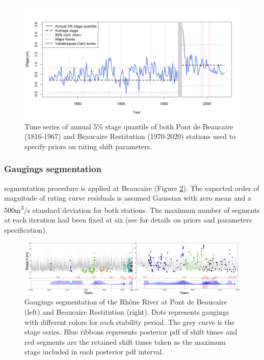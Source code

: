 \documentclass[11pt]{article}
\begin{document}
    \begin{figure}[h]
        \centering
        \includegraphics[width = 12cm]{Figs/5-Quant5perc_both.png}
        \caption{Time series of annual 5\% stage quantile of both Pont de Beaucaire (1816-1967) and Beaucaire Restitution (1970-2020) stations used to specify priors on rating shift parameters.}
        \label{fig:quantile5_both}
    \end{figure}
   
    \subsubsection{Gaugings segmentation}

    \citet{darienzo_detection_2021} segmentation procedure is applied at Beaucaire (Figure \ref{fig:SegmBoth}). The expected order of magnitude of rating curve residuals is assumed Gaussian with zero mean and a 500m\textsuperscript{3}/s standard deviation for both stations. The maximum number of segments at each iteration had been fixed at six (see \citet{darienzo_detection_2021} for details on priors and parameters specification).

    \begin{figure}[h!]
        \centering
        \includegraphics[width =1\linewidth]{Figs/6-SegmBoth.png}
        \caption{Gaugings segmentation of the Rhône River at Pont de Beaucaire (left) and Beaucaire Restitution (right). Dots represents gaugings with different colors for each stability period. The grey curve is the stage series. Blue ribbons represents posterior pdf of shift times and red segments are the retained shift times taken as the maximum stage included in each posterior pdf interval.}
        \label{fig:SegmBoth}
    \end{figure}
    
\end{document}
